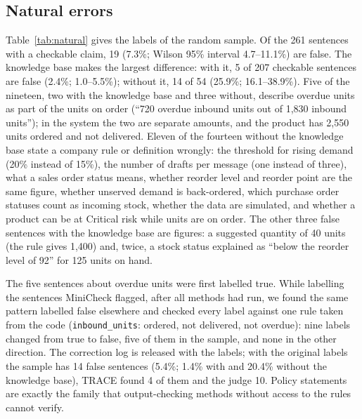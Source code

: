 \documentclass[journal]{IEEEtran}
\begin{document}
\subsection{Natural errors}
Table~\ref{tab:natural} gives the labels of the random sample. Of the 261 sentences with a checkable claim,
19 (7.3\%; Wilson 95\% interval 4.7--11.1\%) are false. The knowledge base makes the largest difference:
with it, 5 of 207 checkable sentences are false (2.4\%; 1.0--5.5\%); without it, 14 of 54 (25.9\%;
16.1--38.9\%). Five of the nineteen, two with the knowledge base and three without, describe overdue units
as part of the units on order (``720 overdue inbound units out of 1,830 inbound units''); in the system the
two are separate amounts, and the product has 2,550 units ordered and not delivered. Eleven of the fourteen
without the knowledge base state a company rule or definition wrongly: the threshold for rising demand (20\%
instead of 15\%), the number of drafts per message (one instead of three), what a sales order status means,
whether reorder level and reorder point are the same figure, whether unserved demand is back-ordered, which
purchase order statuses count as incoming stock, whether the data are simulated, and whether a product can
be at Critical risk while units are on order. The other three false sentences with the
knowledge base are figures: a suggested quantity of 40 units (the rule gives 1,400) and, twice, a stock
status explained as ``below the reorder level of 92'' for 125 units on hand.

The five sentences about overdue units were first labelled true. While labelling the sentences MiniCheck
flagged, after all methods had run, we found the same pattern labelled false elsewhere and checked every
label against one rule taken from the code (\texttt{inbound\_units}: ordered, not delivered, not overdue):
nine labels changed from true to false, five of them in the sample, and none in the other direction. The
correction log is released with the labels; with the original labels the sample has 14 false sentences
(5.4\%; 1.4\% with and 20.4\% without the knowledge base), TRACE found 4 of them and the judge 10. Policy statements are exactly
the family that output-checking methods without access to the rules cannot verify.
\end{document}
